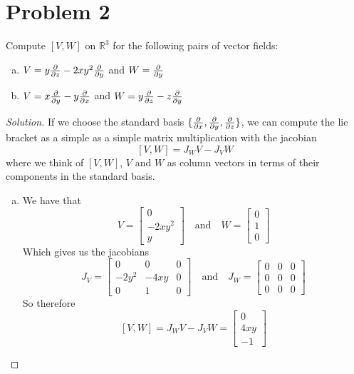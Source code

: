 \documentclass[a4paper]{article}
\begin{document}
\section*{Problem 2}%
Compute $[V,W]$ on $\mathds{R}^3$ for the following pairs of vector fields:
\begin{enumerate}[(a)]
  \item $V = y \pdv{}{z} - 2xy^2\pdv{}{y}$ and $W = \pdv{}{y}$
  \item $V = x \pdv{}{y} - y\pdv{}{x}$ and $W = y \pdv{}{z} - z\pdv{}{y}$
\end{enumerate}

\begin{proof}[Solution]
  If we choose the standard basis $\{ \pdv{}{x}, \pdv{}{y}, \pdv{}{z} \}$, we can compute the lie bracket as a simple as a simple matrix multiplication with the jacobian
  \[
    [V,W] = J_W V - J_V W
  \]
  where we think of $[V,W]$, $V$ and $W$ as column vectors in terms of their components in the standard basis. 
  \begin{enumerate}[(a)]
    \item We have that 
      \[
        V = \begin{bmatrix}
          0 \\
          -2xy^2 \\
          y
        \end{bmatrix} \quad \text{and} \quad
          W = \begin{bmatrix}
           0 \\
           1 \\
           0
          \end{bmatrix}
      \]
      Which gives us the jacobians
      \[
        J_V = \begin{bmatrix}
          0 & 0 & 0 \\
          -2y^2 & -4xy & 0 \\
          0 & 1 & 0
        \end{bmatrix}
        \quad \text{and} \quad
        J_W = \begin{bmatrix}
          0 & 0 & 0 \\
          0 & 0 & 0 \\
          0 & 0 & 0
        \end{bmatrix}
      \]
      So therefore
      \[
        [V,W] = J_WV - J_VW = 
        \begin{bmatrix}
          0 \\
          4xy \\
          -1
        \end{bmatrix}
\]
\end{enumerate}
\end{proof}
\end{document}
